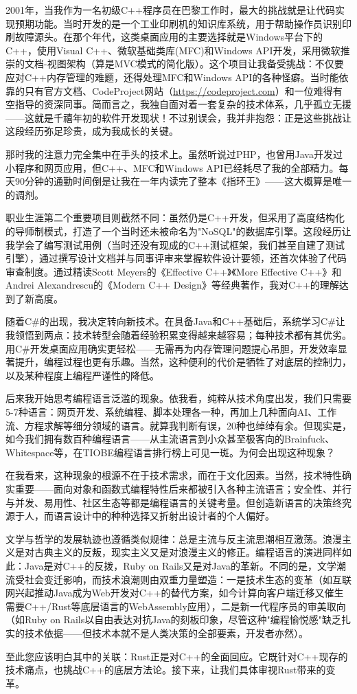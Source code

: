 2001年，当我作为一名初级C++程序员在巴黎工作时，最大的挑战就是让代码实现预期功能。当时开发的是一个工业印刷机的知识库系统，用于帮助操作员识别印刷故障源头。在那个年代，这类桌面应用的主要选择就是Windows平台下的C++，使用Visual C++、微软基础类库(MFC)和Windows API开发，采用微软推崇的文档-视图架构（算是MVC模式的简化版）。这个项目让我备受挑战：不仅要应对C++内存管理的难题，还得处理MFC和Windows API的各种怪癖。当时能依靠的只有官方文档、CodeProject网站（\url{https://codeproject.com}）和一位难得有空指导的资深同事。简而言之，我独自面对着一套复杂的技术体系，几乎孤立无援——这就是千禧年初的软件开发现状！不过别误会，我并非抱怨：正是这些挑战让这段经历弥足珍贵，成为我成长的关键。

那时我的注意力完全集中在手头的技术上。虽然听说过PHP，也曾用Java开发过小程序和网页应用，但C++、MFC和Windows API已经耗尽了我的全部精力。每天90分钟的通勤时间倒是让我在一年内读完了整本《指环王》——这大概算是唯一的调剂。

职业生涯第二个重要项目则截然不同：虽然仍是C++开发，但采用了高度结构化的导师制模式，打造了一个当时还未被命名为"NoSQL"的数据库引擎。这段经历让我学会了编写测试用例（当时还没有现成的C++测试框架，我们甚至自建了测试引擎），通过撰写设计文档并与同事评审来掌握软件设计要领，还首次体验了代码审查制度。通过精读Scott Meyers的《Effective C++》《More Effective C++》和Andrei Alexandrescu的《Modern C++ Design》等经典著作，我对C++的理解达到了新高度。

随着C\#的出现，我决定转向新技术。在具备Java和C++基础后，系统学习C\#让我领悟到两点：技术转型会随着经验积累变得越来越容易；每种技术都有其优劣。用C\#开发桌面应用确实更轻松——无需再为内存管理问题提心吊胆，开发效率显著提升，编程过程也更有乐趣。当然，这种便利的代价是牺牲了对底层的控制力，以及某种程度上编程严谨性的降低。

后来我开始思考编程语言泛滥的现象。依我看，纯粹从技术角度出发，我们只需要5-7种语言：网页开发、系统编程、脚本处理各一种，再加上几种面向AI、工作流、方程求解等细分领域的语言。就算我判断有误，20种也绰绰有余。但现实是，如今我们拥有数百种编程语言——从主流语言到小众甚至极客向的Brainfuck、Whitespace等，在TIOBE编程语言排行榜上可见一斑。为何会出现这种现象？

在我看来，这种现象的根源不在于技术需求，而在于文化因素。当然，技术特性确实重要——面向对象和函数式编程特性后来都被引入各种主流语言；安全性、并行与并发、易用性、社区生态等都是编程语言的关键考量。但创造新语言的决策终究源于人，而语言设计中的种种选择又折射出设计者的个人偏好。

文学与哲学的发展轨迹也遵循类似规律：总是主流与反主流思潮相互激荡。浪漫主义是对古典主义的反叛，现实主义又是对浪漫主义的修正。编程语言的演进同样如此：Java是对C++的反拨，Ruby on Rails又是对Java的革新。不同的是，文学潮流受社会变迁影响，而技术浪潮则由双重力量塑造：一是技术生态的变革（如互联网兴起推动Java成为Web开发对C++的替代方案，如今计算向客户端迁移又催生需要C++/Rust等底层语言的WebAssembly应用），二是新一代程序员的审美取向（如Ruby on Rails以自由表达对抗Java的刻板印象，尽管这种"编程愉悦感"缺乏扎实的技术依据——但技术本就不是人类决策的全部要素，开发者亦然）。

至此您应该明白其中的关联：Rust正是对C++的全面回应。它既针对C++现存的技术痛点，也挑战C++的底层方法论。接下来，让我们具体审视Rust带来的变革。













